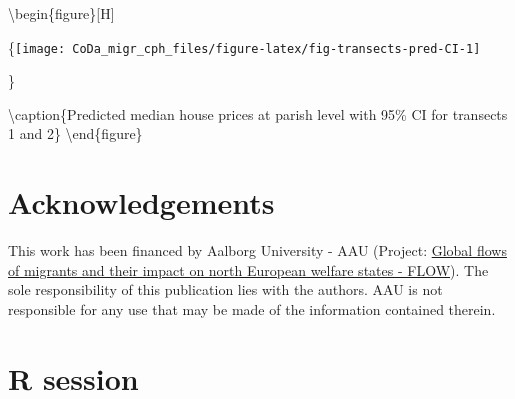 \documentclass[
  12pt,
]{article}
\begin{document}
\textbackslash begin\{figure\}{[}H{]}

\{\centering \texttt{[image: CoDa\_migr\_cph\_files/figure-latex/fig-transects-pred-CI-1]}

\}

\textbackslash caption\{Predicted median house prices at parish level
with 95\% CI for transects 1 and 2\}\label{fig:fig-transects-pred-CI}
\textbackslash end\{figure\}

\hypertarget{acknowledgements}{%
\section{Acknowledgements}\label{acknowledgements}}

This work has been financed by Aalborg University - AAU (Project:
\href{https://www.flow.aau.dk/}{Global flows of migrants and their
impact on north European welfare states - FLOW}). The sole
responsibility of this publication lies with the authors. AAU is not
responsible for any use that may be made of the information contained
therein.

\hypertarget{r-session}{%
\section{R session}\label{r-session}}
\end{document}
